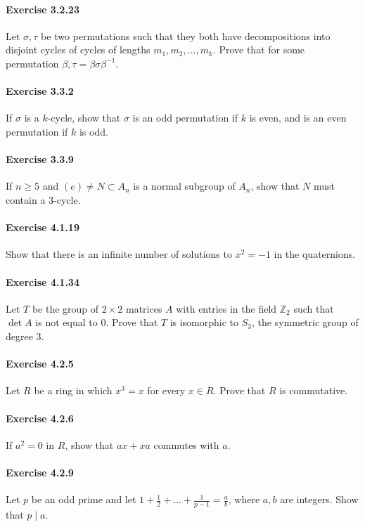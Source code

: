 \documentclass{article}
\begin{document}
\paragraph{Exercise 3.2.23} Let $\sigma, \tau$ be two permutations such that they both have decompositions into disjoint cycles of cycles of lengths $m_1, m_2, \ldots, m_k$. Prove that for some permutation $\beta, \tau = \beta \sigma \beta^{-1}$.

\paragraph{Exercise 3.3.2} If $\sigma$ is a $k$-cycle, show that $\sigma$ is an odd permutation if $k$ is even, and is an even permutation if $k$ is odd.

\paragraph{Exercise 3.3.9} If $n \geq 5$ and $(e) \neq N \subset A_n$ is a normal subgroup of $A_n$, show that $N$ must contain a 3-cycle.

\paragraph{Exercise 4.1.19} Show that there is an infinite number of solutions to $x^2 = -1$ in the quaternions.

\paragraph{Exercise 4.1.34} Let $T$ be the group of $2\times 2$ matrices $A$ with entries in the field $\mathbb{Z}_2$ such that $\det A$ is not equal to 0. Prove that $T$ is isomorphic to $S_3$, the symmetric group of degree 3.

\paragraph{Exercise 4.2.5} Let $R$ be a ring in which $x^3 = x$ for every $x \in R$. Prove that $R$ is commutative.

\paragraph{Exercise 4.2.6} If $a^2 = 0$ in $R$, show that $ax + xa$ commutes with $a$.

\paragraph{Exercise 4.2.9} Let $p$ be an odd prime and let $1 + \frac{1}{2} + ... + \frac{1}{p - 1} = \frac{a}{b}$, where $a, b$ are integers. Show that $p \mid a$.
\end{document}
